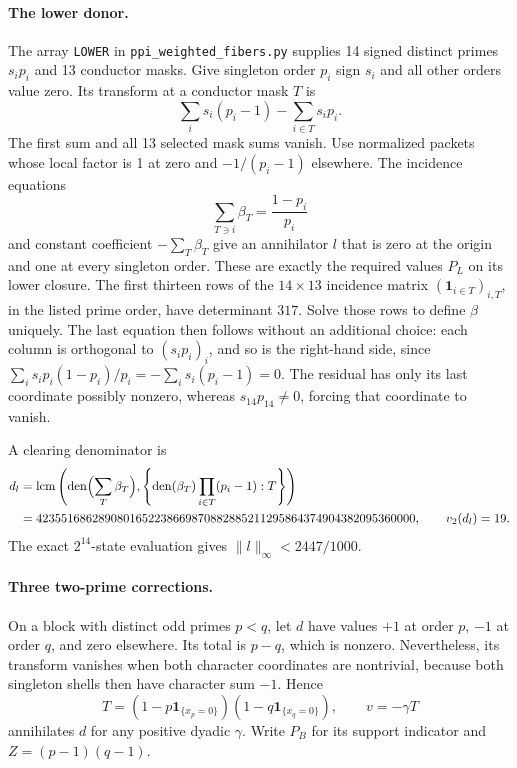 \documentclass[11pt]{article}
\numberwithin{equation}{section}
\theoremstyle{definition}
\theoremstyle{remark}
\newcommand{\ind}{\mathbf1}
\begin{document}
\paragraph{The lower donor.}
The array \texttt{LOWER} in \texttt{ppi\_weighted\_fibers.py} supplies 14 signed distinct primes $s_i p_i$ and 13
conductor masks.  Give singleton order $p_i$ sign $s_i$ and all other
orders value zero.  Its transform at a conductor mask $T$ is
\[
 \sum_i s_i(p_i-1)-\sum_{i\in T}s_i p_i.
\]
The first sum and all 13 selected mask sums vanish.  Use normalized
packets whose local factor is 1 at zero and $-1/(p_i-1)$ elsewhere.
The incidence equations
\[
 \sum_{T\ni i}\beta_T=\frac{1-p_i}{p_i}
\]
and constant coefficient $-\sum_T\beta_T$ give an annihilator $l$ that
is zero at the origin and one at every singleton order.  These are
exactly the required values $P_L$ on its lower closure.
The first thirteen rows of the $14\times13$ incidence matrix
$(\mathbf1_{i\in T})_{i,T}$, in the listed prime order, have determinant
$317$. Solve those rows to define $\beta$ uniquely. The last equation
then follows without an additional choice: each column is orthogonal
to $(s_ip_i)_i$, and so is the right-hand side, since
$\sum_i s_ip_i(1-p_i)/p_i=-\sum_i s_i(p_i-1)=0$.
The residual has only its last coordinate possibly nonzero, whereas
$s_{14}p_{14}\ne0$, forcing that coordinate to vanish.

A clearing
denominator is
\begin{align*}
 d_l&=\operatorname{lcm}\left(
       \operatorname{den}\Bigl(\sum_T\beta_T\Bigr),
       \left\{\operatorname{den}(\beta_T)
                   \prod_{i\in T}(p_i-1):T\right\}\right)\\
    &=4235516862890801652238669870882885211295864374904382095360000,
 \qquad v_2(d_l)=19.
\end{align*}
The exact $2^{14}$-state evaluation gives
$\|l\|_\infty<2447/1000$.

\paragraph{Three two-prime corrections.}
On a block with distinct odd primes $p<q$, let $d$ have values $+1$ at
order $p$, $-1$ at order $q$, and zero elsewhere.  Its total is $p-q$,
which is nonzero.  Nevertheless, its transform vanishes when both
character coordinates are nontrivial, because both singleton shells
then have character sum $-1$.  Hence
\[
 T=(1-p\ind_{\{x_p=0\}})(1-q\ind_{\{x_q=0\}}),\qquad
 v=-\gamma T
\]
annihilates $d$ for any positive dyadic $\gamma$.  Write $P_B$ for its support
indicator and $Z=(p-1)(q-1)$.
\end{document}
